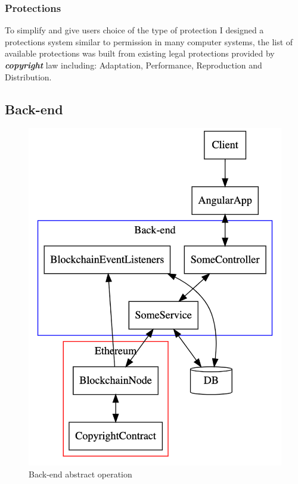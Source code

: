 \documentclass[12pt]{article}
\newcommand{\keyword}[1]{\textbf{\textit{#1}}}
\begin{document}
\subsubsection{Protections}

To simplify and give users choice of the type of protection I designed a protections system similar to permission in many computer systems, the list of available protections was built from existing legal protections provided by \keyword{copyright} law \cite{rights_granted} including: Adaptation, Performance, Reproduction and Distribution. 

\subsection{Back-end}

\begin{figure}[H]
\caption{Back-end abstract operation}
\centering
\includegraphics[width=\textwidth,height=0.4\textheight,keepaspectratio]{images/operational/example-backend}
\centering
\end{figure}
\end{document}
